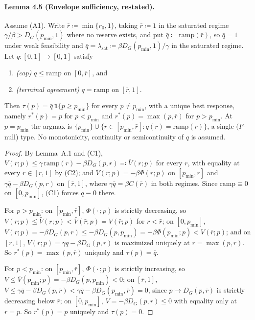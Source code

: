\documentclass[acmsmall,nonacm,screen]{acmart}
\theoremstyle{acmplain}%
\theoremstyle{acmdefinition}%
\numberwithin{equation}{section}
\begin{document}
\begin{appendix}
\paragraph*{Lemma 4.5 (Envelope sufficiency, restated).}
Assume (A1). Write $\bar r \coloneqq \min\{r_0,1\}$, taking $\bar r \coloneqq 1$ in the saturated regime $\gamma/\beta > D_G(p_{\min},1)$ where no reserve exists, and put $\bar q \coloneqq \mathrm{ramp}(\bar r)$, so $\bar q = 1$ under weak feasibility and $\bar q = \lambda_{\mathrm{sat}} \coloneqq \beta D_G(p_{\min},1)/\gamma$ in the saturated regime. Let $q : [0,1] \to [0,1]$ satisfy
\begin{enumerate}
\item[(C1)] \emph{(cap)} $q \le \mathrm{ramp}$ on $[0,\bar r]$, and
\item[(C2)] \emph{(terminal agreement)} $q = \mathrm{ramp}$ on $[\bar r,1]$.
\end{enumerate}
Then $\tau(p) = \bar q\,\mathbf 1\{p \ge p_{\min}\}$ for every $p \ne p_{\min}$, with a unique best response, namely $r^*(p) = p$ for $p < p_{\min}$ and $r^*(p) = \max(p,\bar r)$ for $p > p_{\min}$. At $p = p_{\min}$ the argmax is $\{p_{\min}\} \cup \{r \in [p_{\min},\bar r] : q(r) = \mathrm{ramp}(r)\}$, a single ($F$-null) type. No monotonicity, continuity or semicontinuity of $q$ is assumed.

\begin{proof}
By Lemma~A.1 and (C1), $V(r;p) \le \gamma\,\mathrm{ramp}(r) - \beta D_G(p,r) \eqqcolon \bar V(r;p)$ for every $r$, with equality at every $r \in [\bar r,1]$ by (C2); and $\bar V(r;p) = -\beta\Phi(r;p)$ on $[p_{\min},\bar r]$ and $\gamma\bar q - \beta D_G(p,r)$ on $[\bar r,1]$, where $\gamma \bar q = \beta C(\bar r)$ in both regimes. Since $\mathrm{ramp} \equiv 0$ on $[0,p_{\min}]$, (C1) forces $q \equiv 0$ there.

For $p > p_{\min}$: on $[p_{\min},\bar r]$, $\Phi(\cdot\,;p)$ is strictly decreasing, so $V(r;p) \le \bar V(r;p) < \bar V(\bar r;p) = V(\bar r;p)$ for $r < \bar r$; on $[0,p_{\min}]$, $V(r;p) = -\beta D_G(p,r) \le -\beta D_G(p,p_{\min}) = -\beta\Phi(p_{\min};p) < V(\bar r;p)$; and on $[\bar r,1]$, $V(r;p) = \gamma\bar q - \beta D_G(p,r)$ is maximized uniquely at $r = \max(p,\bar r)$. So $r^*(p) = \max(p,\bar r)$ uniquely and $\tau(p) = \bar q$.

For $p < p_{\min}$: on $[p_{\min},\bar r]$, $\Phi(\cdot\,;p)$ is strictly increasing, so $V \le \bar V(p_{\min};p) = -\beta D_G(p,p_{\min}) < 0$; on $[\bar r,1]$, $V \le \gamma\bar q - \beta D_G(p,\bar r) < \gamma\bar q - \beta D_G(p_{\min},\bar r) = 0$, since $p \mapsto D_G(p,\bar r)$ is strictly decreasing below $\bar r$; on $[0,p_{\min}]$, $V = -\beta D_G(p,r) \le 0$ with equality only at $r = p$. So $r^*(p) = p$ uniquely and $\tau(p) = 0$.


\end{proof}
\end{appendix}
\end{document}
